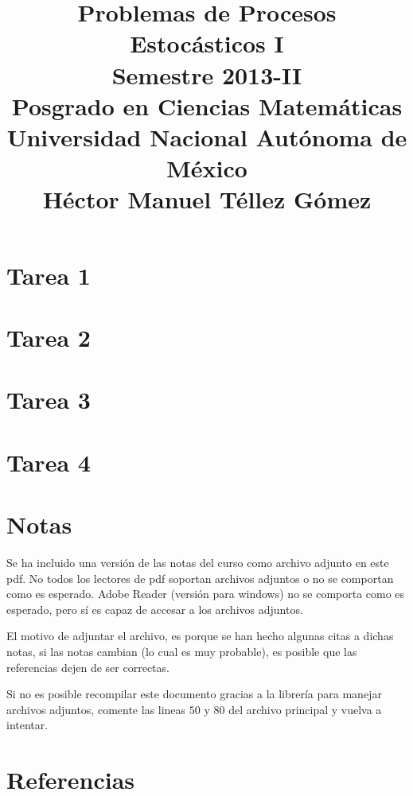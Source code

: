 \documentclass[a5paper,oneside]{amsart}
\title[Problemas de Procesos I]{
    Problemas de Procesos Estocásticos I\\ 
    Semestre 2013-II\\ 
    Posgrado en Ciencias Matemáticas\\ 
    Universidad Nacional Autónoma de México\\
    Héctor Manuel Téllez Gómez
}
\theoremstyle{definition}
\numberwithin{section}{part}
\numberwithin{equation}{subsection}
\begin{document}
    \maketitle
    \part{Tarea 1}
                
        \nqed
        
    \part{Tarea 2}
                
        \nqed
        
    \part{Tarea 3}
                
        \nqed
            
    \part{Tarea 4}
                
        \nqed    
    
    
    \part*{Notas}\label{notas}
        Se ha incluido una versión de las notas del curso como archivo adjunto en este pdf. No todos los lectores de pdf soportan archivos 
        adjuntos o no se comportan como es esperado. Adobe Reader (versión para windows) no se comporta como es esperado, pero sí es capaz de accesar a los
        archivos adjuntos.\pn
        
        El motivo de adjuntar el archivo, es porque se han hecho algunas citas a dichas notas, si las notas cambian (lo cual es muy probable), 
        es posible que las referencias dejen de ser correctas.\pn
        
        Si no es posible recompilar este documento gracias a la librería para manejar archivos adjuntos, comente las lineas $50$ y $80$ del archivo principal y 
        vuelva a intentar. 
    \newpage
    
    \part*{Referencias}
        
        
\end{document}
